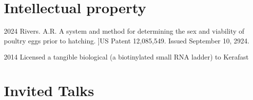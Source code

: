\documentclass[12pt,letterpaper]{report}
\begin{document}
\begin{tablist}
        
              
        
       \end{tablist} 
        
   \section*{Intellectual property}
          \begin{tablist}
           \item[2024] Rivers. A.R. A system and method for determining the sex and viability of poultry eggs prior to hatching. ]\tab US Patent 12,085,549. Issued September 10, 2924.  
          \item[2014]\tab  Licensed a tangible biological (a biotinylated small RNA ladder) to Kerafast
          
          \end{tablist} 
    \section*{Invited Talks}
\end{document}
